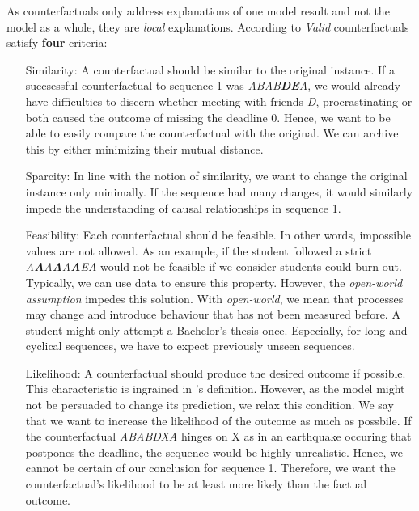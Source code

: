 \documentclass[./../../paper.tex]{subfiles}
\begin{document}
As counterfactuals only address explanations of one model result and not the model as a whole, they are \emph{local} explanations\autocite[p. 212]{molnar2019}. According to \citeauthor{molnar2019} \emph{Valid} counterfactuals satisfy \textbf{four} criteria\autocite[p. 212]{molnar2019}:

\begin{itemize}
    \item[Similarity:] A counterfactual should be similar to the original instance. If a succsessful counterfactual to sequence 1 was \textit{ABAB\textbf{DE}A}, we would already have difficulties to discern whether meeting with friends \textit{D}, procrastinating  or both caused the outcome of missing the deadline 0. Hence, we want to be able to easily compare the counterfactual with the original. We can archive this by either minimizing their mutual distance.
    \item[Sparcity:] In line with the notion of similarity, we want to change the original instance only minimally. If the sequence had many changes, it would similarly impede the understanding of causal relationships in sequence 1. 
    \item[Feasibility:] Each counterfactual should be feasible. In other words, impossible values are not allowed. As an example, if the student followed a strict \textit{A\textbf{A}A\textbf{A}A\textbf{A}EA} would not be feasible if we consider students could burn-out. Typically, we can use data to ensure this property. However, the \emph{open-world assumption} impedes this solution. With \emph{open-world}, we mean that processes may change and introduce behaviour that has not been measured before. A student might only attempt a Bachelor's thesis once. Especially, for long and cyclical sequences, we have to expect previously unseen sequences.  
    \item[Likelihood:] A counterfactual should produce the desired outcome if possible. This characteristic is ingrained in \citeauthor{molnar2019}'s definition. However, as the model might not be persuaded to change its prediction, we relax this condition. We say that we want to increase the likelihood of the outcome as much as possbile. If the counterfactual \textit{ABABDXA} hinges on X as in an earthquake occuring that postpones the deadline, the sequence would be highly unrealistic. Hence, we cannot be certain of our conclusion for sequence 1. Therefore, we want the counterfactual's likelihood to be at least more likely than the factual outcome. 
\end{itemize}
\end{document}
